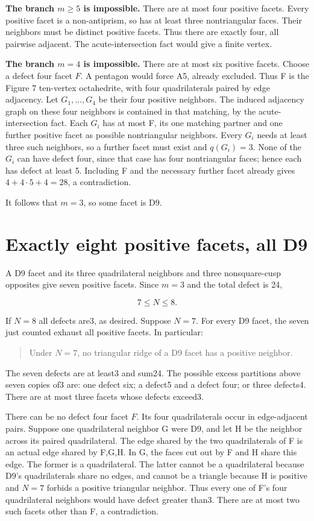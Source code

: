 \documentclass[11pt]{article}
\begin{document}
\textbf{The branch \(m\ge5\) is impossible.} There are at most four positive facets. Every positive facet is a non-antiprism, so has at least three nontriangular faces. Their neighbors must be distinct positive facets. Thus there are exactly four, all pairwise adjacent. The acute-intersection fact would give a finite vertex.

\textbf{The branch \(m=4\) is impossible.} There are at most six positive facets. Choose a defect four facet \(F\). A pentagon would force A5, already excluded. Thus F is the Figure 7 ten-vertex octahedrite, with four quadrilaterals paired by edge adjacency. Let \(G_1,\dots,G_4\) be their four positive neighbors. The induced adjacency graph on these four neighbors is contained in that matching, by the acute-intersection fact. Each \(G_i\) has at most F, its one matching partner and one further positive facet as possible nontriangular neighbors. Every \(G_i\) needs at least three such neighbors, so a further facet must exist and \(q(G_i)=3\). None of the \(G_i\) can have defect four, since that case has four nontriangular faces; hence each has defect at least 5. Including F and the necessary further facet already gives \(4+4\cdot5+4=28\), a contradiction.

It follows that \textbf{\(m=3\)}, so some facet is D9.

\section{Exactly eight positive facets, all D9}\label{exactly-eight-positive-facets-all-d9}

A D9 facet and its three quadrilateral neighbors and three nonsquare-cusp opposites give seven positive facets. Since \(m=3\) and the total defect is 24,

\[
 7\le N\le8. \tag{2}
\]

If \(N=8\) all defects are3, as desired. Suppose \(N=7\). For every D9 facet, the seven just counted exhaust all positive facets. In particular:

\begin{quote}
Under \(N=7\), no triangular ridge of a D9 facet has a positive neighbor.
\end{quote}

The seven defects are at least3 and sum24. The possible excess partitions above seven copies of3 are: one defect six; a defect5 and a defect four; or three defects4. There are at most three facets whose defects exceed3.

There can be no defect four facet \(F\). Its four quadrilaterals occur in edge-adjacent pairs. Suppose one quadrilateral neighbor G were D9, and let H be the neighbor across its paired quadrilateral. The edge shared by the two quadrilaterals of F is an actual edge shared by F,G,H. In G, the faces cut out by F and H share this edge. The former is a quadrilateral. The latter cannot be a quadrilateral because D9's quadrilaterals share no edges, and cannot be a triangle because H is positive and \(N=7\) forbids a positive triangular neighbor. Thus every one of F's four quadrilateral neighbors would have defect greater than3. There are at most two such facets other than F, a contradiction.
\end{document}
